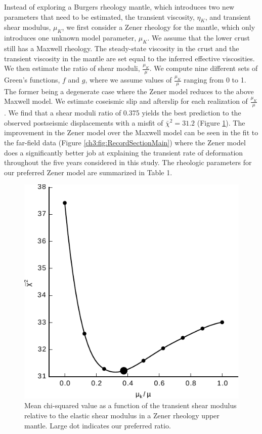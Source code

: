 Instead of exploring a Burgers rheology mantle, which introduces two new parameters that need to be estimated, the transient viscosity, $\eta_{K}$, and transient shear modulus, $\mu_{K}$, we first consider a Zener rheology for the mantle, which only introduces one unknown model parameter, $\mu_{K}$.  We assume that the lower crust still has a Maxwell rheology. The steady-state viscosity in the crust and the transient viscosity in the mantle are set equal to the inferred effective viscosities.  We then estimate the ratio of shear moduli, $\frac{\mu_K}{\mu}$. We compute nine different sets of Green's functions, $f$ and $g$, where we assume values of $\frac{\mu_K}{\mu}$ ranging from 0 to 1. The former being a degenerate case where the Zener model reduces to the above Maxwell model.  We estimate coseismic slip and afterslip for each realization of $\frac{\mu_K}{\mu}$.  We find that a shear moduli ratio of 0.375 yields the best prediction to the observed postseismic displacements with a misfit of $\bar\chi^2=31.2$ (Figure \ref{ch3:fig:ShearModulusRatio}).  The improvement in the Zener model over the Maxwell model can be seen in the fit to the far-field data (Figure \ref{ch3:fig:RecordSectionMain}) where the Zener model does a significantly better job at explaining the transient rate of deformation throughout the five years considered in this study.  The rheologic parameters for our preferred Zener model are summarized in Table 1.

\begin{figure}
\includegraphics[scale=1.0]{ch3/figures/2016jb013114-f13}
\centering 
\caption{Mean chi-squared value as a function of the transient shear modulus relative to the elastic shear modulus in a Zener rheology upper mantle. Large dot indicates our preferred ratio.}
\label{ch3:fig:ShearModulusRatio}
\end{figure}

